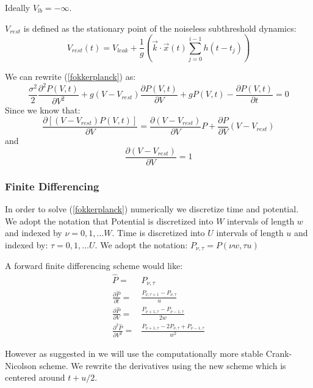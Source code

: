 \documentclass[10pt]{article}
\begin{document}
Ideally $V_{lb} = -\infty $.

$V_{rest}$ is defined as the stationary point of the noiseless
subthreshold dynamics:
\begin{equation}
    V_{rest}(t) = V_{leak} + \frac{1}{g}(\vec{k} \cdot \vec{x}(t)
    \sum_{j=0}^{i-1}h(t-t_j))
\end{equation}


We can rewrite (\ref{fokkerplanck}) as:
\begin{equation}
    \frac{\sigma^2}{2} \frac{\partial^2 P(V,t) } {\partial V^2} +
    g(V-V_{rest})\frac{\partial P(V,t)}{\partial V} +
    gP(V,t) -
    \frac{\partial P(V,t)}{\partial t} = 
    0
\end{equation}
Since we know that:
\begin{equation}
    \frac{\partial[(V-V_{rest})P(V,t)]}{\partial V} =
    \frac{\partial (V-V_{rest})}{\partial V}  P +
    \frac{\partial P}{\partial V} (V-V_{rest})
\end{equation}
and
\begin{equation}
    \frac{\partial (V-V_{rest})}{\partial V} = 1
\end{equation}

\subsubsection{Finite Differencing}

In order to solve (\ref{fokkerplanck}) numerically we discretize time
and potential. We adopt the notation that Potential is discretized
into $W$ intervals of length $w$ and indexed
by $\nu= 0,1, \dots W $.  Time is discretized  into $U$ intervals of
length $u$ and indexed by: $\tau= 0,1, \dots U $.
We adopt the notation: $P_{\nu,\tau} = P(\nu w,\tau u)$

A forward finite differencing scheme would like:
\begin{eqnarray}
    \hat{P} =& P_{\nu,\tau} \\
%
    \frac{\partial \hat{P}}{\partial t} =& \frac{P_{\nu,\tau +1 } -
    P_{\nu,\tau}}{u} \\
%
    \frac{\partial \hat{P}}{\partial V} =& 
    \frac{P_{\nu +1,\tau } -
    P_{\nu - 1,\tau } }
    {2w} \\
%
    \frac{\partial^2 \hat{P}}{\partial V^2} =& 
    \frac{P_{\nu+1,\tau} - 2 P_{\nu,\tau} + P_{\nu-1,\tau}}
    {w^2} 
\end{eqnarray}

However as suggested in \cite{PaninskiHaithSzirtes} we will use the
computationally more stable Crank-Nicolson scheme\cite{press}.  
We rewrite the derivatives using the new scheme which is centered around $t +
u/2$.
\end{document}
